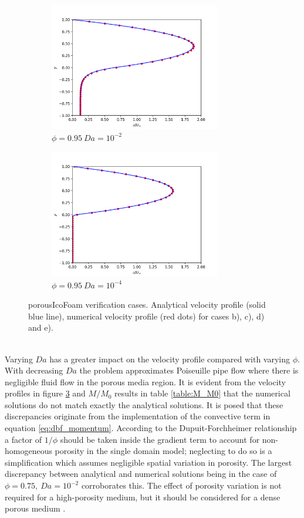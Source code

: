 \documentclass[a4paper,11pt]{report}
\begin{document}
\begin{figure}[ht]
\begin{subfigure}[b]{75mm}
    \end{subfigure}
    \\
    \begin{subfigure}[b]{75mm}
        \includegraphics[width=75mm]{"pty0-95_Da1e-2.png"}
        \caption{$\phi=0.95\ Da=10^{-2}$}
        \label{fig:pty095_Da1e-2}
    \end{subfigure}
    \begin{subfigure}[b]{75mm}
        \includegraphics[width=75mm]{"pty0-95_Da1e-4.png"}
        \caption{$\phi=0.95\ Da=10^{-4}$}
        \label{fig:pty095_Da1e-4}
    \end{subfigure}
    \caption{porousIcoFoam verification cases. Analytical velocity profile (solid blue line), numerical velocity profile (red dots) for cases b), c), d) and e).}\label{fig:porousIcoFoam_verification}
\end{figure}\\
Varying $Da$ has a greater impact on the velocity profile compared with varying $\phi$. With decreasing $Da$ the problem approximates Poiseuille pipe flow where there is negligible fluid flow in the porous media region. It is evident from the velocity profiles in figure \ref{fig:porousIcoFoam_verification} and $M/M_0$ results in table \ref{table:M_M0} that the numerical solutions do not match exactly the analytical solutions. It is posed that these discrepancies originate from the implementation of the convective term in equation \ref{eq:dbf_momentum}. According to the Dupuit-Forchheimer relationship a factor of $1/\phi$ should be taken inside the gradient term to account for non-homogeneous porosity in the single domain model; neglecting to do so is a simplification which assumes negligible spatial variation in porosity. The largest discrepancy between analytical and numerical solutions being in the case of $\phi=0.75,\ Da=10^{-2}$ corroborates this. The effect of porosity variation is not required for a high-porosity medium, but it should be considered for a dense porous medium \cite{Vafai1995}.
\end{document}
